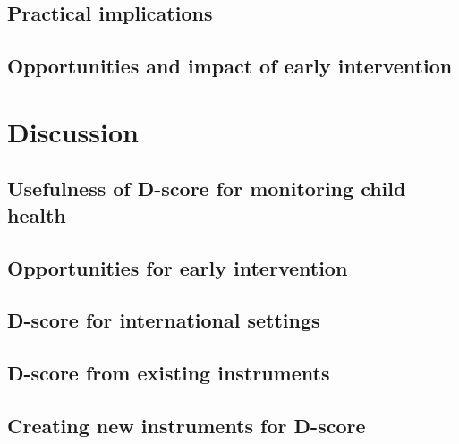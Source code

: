 \documentclass[]{book}
\begin{document}
\section{Practical implications}\label{practical-implications-1}

\section{Opportunities and impact of early
intervention}\label{opportunities-and-impact-of-early-intervention}

\chapter{Discussion}\label{discussion}

\section{Usefulness of D-score for monitoring child
health}\label{usefulness-of-d-score-for-monitoring-child-health}

\section{Opportunities for early
intervention}\label{opportunities-for-early-intervention}

\section{D-score for international
settings}\label{d-score-for-international-settings}

\section{D-score from existing
instruments}\label{d-score-from-existing-instruments}

\section{Creating new instruments for
D-score}\label{creating-new-instruments-for-d-score}


\end{document}
